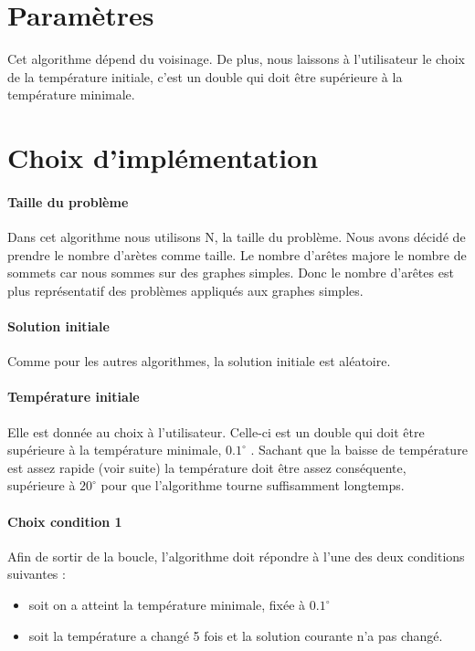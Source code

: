 \documentclass[12pt]{article}
\begin{document}
\section{Paramètres}
Cet algorithme dépend du voisinage. De plus, nous laissons à l’utilisateur le choix de la température initiale, c’est un double qui doit être supérieure à la température minimale.

\section{Choix d'implémentation}

\paragraph{Taille du problème}
Dans cet algorithme nous utilisons N, la taille du problème. Nous avons décidé de prendre le nombre d’arètes comme taille. Le nombre d’arêtes majore le nombre de sommets car nous sommes sur des graphes simples. Donc le nombre d’arêtes est plus représentatif des problèmes appliqués aux graphes simples.

\paragraph{Solution initiale} Comme pour les autres algorithmes, la solution initiale est aléatoire.

\paragraph{Température initiale} Elle est donnée au choix à l’utilisateur. Celle-ci est un double qui doit être supérieure à la température minimale, $0.1^\circ$ . Sachant que la baisse de température est assez rapide (voir suite) la température doit être assez conséquente, supérieure à $20^\circ$ pour que l’algorithme tourne suffisamment longtemps.

\paragraph{Choix condition 1} Afin de sortir de la boucle, l’algorithme doit répondre à l’une des deux conditions suivantes :
	\begin{itemize}
    \item soit on a atteint la température minimale, fixée à $0.1^\circ$
    \item soit la température a changé 5 fois et la solution courante n’a pas changé.
    \end{itemize}
\end{document}
